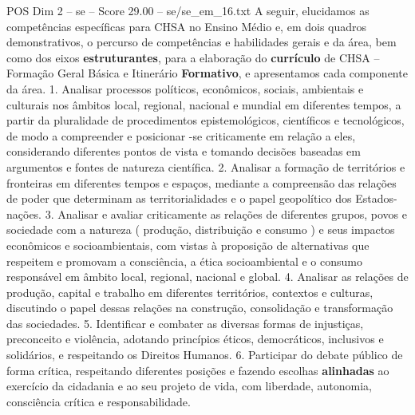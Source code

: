 \begin{textsample}{POS Dim 2 – se – Score 29.00 – se/se\_em\_16.txt}
A seguir, elucidamos as competências específicas para CHSA no Ensino Médio e, em dois quadros demonstrativos, o percurso de competências e habilidades gerais e da área, bem como dos eixos \textbf{estruturantes}, para a elaboração do \textbf{currículo} de CHSA – Formação Geral Básica e Itinerário \textbf{Formativo}, e apresentamos cada componente da área. 1.
Analisar processos políticos, econômicos, sociais, ambientais e culturais nos âmbitos local, regional, nacional e mundial em diferentes tempos, a partir da pluralidade de procedimentos epistemológicos, científicos e tecnológicos, de modo a compreender e posicionar -se criticamente em relação a eles, considerando diferentes pontos de vista e tomando decisões baseadas em argumentos e fontes de natureza científica. 2.
Analisar a formação de territórios e fronteiras em diferentes tempos e espaços, mediante a compreensão das relações de poder que determinam as territorialidades e o papel geopolítico dos Estados-nações. 3.
Analisar e avaliar criticamente as relações de diferentes grupos, povos e sociedade com a natureza ( produção, distribuição e consumo ) e seus impactos econômicos e socioambientais, com vistas à proposição de alternativas que respeitem e promovam a consciência, a ética socioambiental e o consumo responsável em âmbito local, regional, nacional e global. 4.
Analisar as relações de produção, capital e trabalho em diferentes territórios, contextos e culturas, discutindo o papel dessas relações na construção, consolidação e transformação das sociedades. 5.
Identificar e combater as diversas formas de injustiças, preconceito e violência, adotando princípios éticos, democráticos, inclusivos e solidários, e respeitando os Direitos Humanos. 6.
Participar do debate público de forma crítica, respeitando diferentes posições e fazendo escolhas \textbf{alinhadas} ao exercício da cidadania e ao seu projeto de vida, com liberdade, autonomia, consciência crítica e responsabilidade.

\end{textsample}
